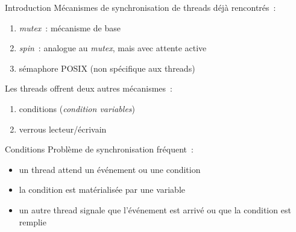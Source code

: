%
%

\def\inc{inc6-thsync}




\begin {frame} {Introduction}
    Mécanismes de synchronisation de threads déjà rencontrés~:

    \begin {enumerate}
	\item \emph {mutex}~: mécanisme de base
	\item \emph {spin}~: analogue au \emph {mutex}, mais avec
	    attente active
	\item sémaphore POSIX (non spécifique aux threads)
    \end {enumerate}

    Les threads offrent deux autres mécanismes~:
    
    \begin {enumerate}
	\addtocounter {enumi} {3}
	\item conditions (\emph {condition variables\/})
	\item verrous lecteur/écrivain
    \end {enumerate}

\end {frame}



\begin {frame} {Conditions}
    Problème de synchronisation fréquent~:

    \begin {itemize}
	\item un thread attend un événement ou une condition
	\item la condition est matérialisée par une variable
	\item un autre thread signale que l'événement est arrivé
	    ou que la condition est remplie
    \end {itemize}
\end {frame}

